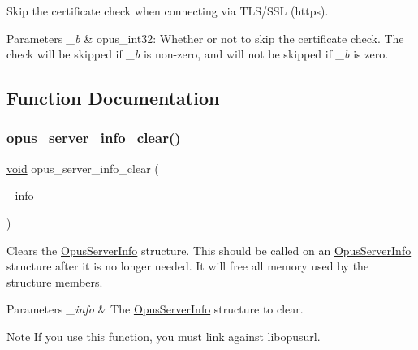 Skip the certificate check when connecting via T\+L\+S/\+S\+SL (https). 
\begin{DoxyParams}{Parameters}
{\em \+\_\+b} & {\ttfamily opus\+\_\+int32}\+: Whether or not to skip the certificate check. The check will be skipped if {\itshape \+\_\+b} is non-\/zero, and will not be skipped if {\itshape \+\_\+b} is zero. \\
\hline
\end{DoxyParams}


\subsection{Function Documentation}
\mbox{\label{group__url__options_ga096536e460277fe890acb265d8fdbd63}} 
\subsubsection{\texorpdfstring{opus\+\_\+server\+\_\+info\+\_\+clear()}{opus\_server\_info\_clear()}}
{\footnotesize\ttfamily \hyperlink{png_8h_ac9c84fa68bbad002983e35ce3663c686}{void} opus\+\_\+server\+\_\+info\+\_\+clear (\begin{DoxyParamCaption}\item[{\hyperlink{struct_opus_server_info}{Opus\+Server\+Info} $\ast$}]{\+\_\+info }\end{DoxyParamCaption})}

Clears the \hyperlink{struct_opus_server_info}{Opus\+Server\+Info} structure. This should be called on an \hyperlink{struct_opus_server_info}{Opus\+Server\+Info} structure after it is no longer needed. It will free all memory used by the structure members. 
\begin{DoxyParams}{Parameters}
{\em \+\_\+info} & The \hyperlink{struct_opus_server_info}{Opus\+Server\+Info} structure to clear. \\
\hline
\end{DoxyParams}
\begin{DoxyNote}{Note}
If you use this function, you must link against {\ttfamily libopusurl}. 
\end{DoxyNote}
\mbox{\label{group__url__options_ga8a8c97266e46504e064bba1a70495738}} 
